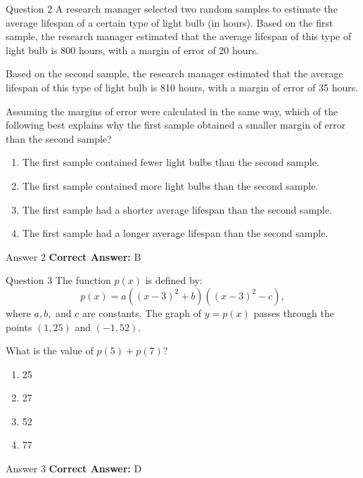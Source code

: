 \documentclass{beamer}
\begin{document}
\begin{frame}{Question 2}
\small
A research manager selected two random samples to estimate the average lifespan of a certain type of light bulb (in hours). Based on the first sample, the research manager estimated that the average lifespan of this type of light bulb is 800 hours, with a margin of error of 20 hours.

Based on the second sample, the research manager estimated that the average lifespan of this type of light bulb is 810 hours, with a margin of error of 35 hours.

Assuming the margins of error were calculated in the same way, which of the following best explains why the first sample obtained a smaller margin of error than the second sample?
\vspace{0.35cm}
\begin{enumerate}
    \item[A.] The first sample contained fewer light bulbs than the second sample.
    \item[B.] The first sample contained more light bulbs than the second sample.
    \item[C.] The first sample had a shorter average lifespan than the second sample.
    \item[D.] The first sample had a longer average lifespan than the second sample.
\end{enumerate}
\end{frame}
\begin{frame}{Answer 2}
\small
\textbf{Correct Answer:} B
\end{frame}

\begin{frame}{Question 3}
\small
The function \(p(x)\) is defined by:
\[
p(x) = a((x - 3)^2 + b)((x - 3)^2 - c),
\]
where \(a, b,\) and \(c\) are constants. The graph of \(y = p(x)\) passes through the points \((1, 25)\) and \((-1, 52)\).

What is the value of \(p(5) + p(7)\)?
\vspace{0.35cm}
\begin{enumerate}
    \item[A.] 25
    \item[B.] 27
    \item[C.] 52
    \item[D.] 77
\end{enumerate}
\end{frame}
\begin{frame}{Answer 3}
\small
\textbf{Correct Answer:} D
\end{frame}
\end{document}
